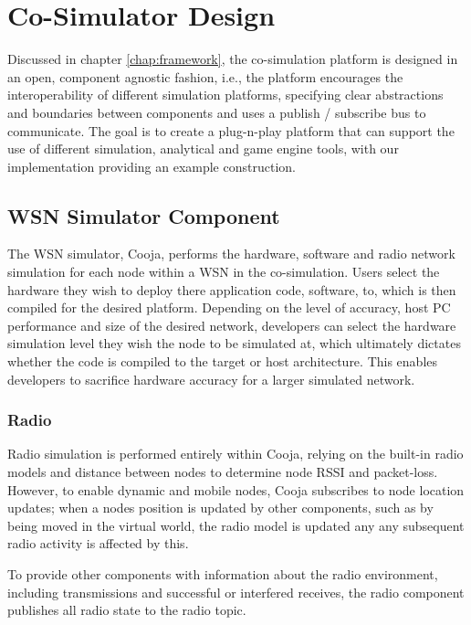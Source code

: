 \section{Co-Simulator Design}
\label{sec:Design}
Discussed in chapter \ref{chap:framework}, the co-simulation platform is designed in an open, component agnostic fashion, i.e., the platform encourages the interoperability of different simulation platforms, specifying clear abstractions and boundaries between components and uses a publish / subscribe bus to communicate. The goal is to create a plug-n-play platform that can support the use of different simulation, analytical and game engine tools, with our implementation providing an example construction.

\subsection{WSN Simulator Component} %
\label{sub:wsn_simulator_component}

The WSN simulator, Cooja, performs the hardware, software and radio network simulation for each node within a WSN in the co-simulation. 
Users select the hardware they wish to deploy there application code, software, to, which is then compiled for the desired platform. Depending on the level of accuracy, host PC performance and size of the desired network, developers can select the hardware simulation level they wish the node to be simulated at, which ultimately dictates whether the code is compiled to the target or host architecture. This enables developers to sacrifice hardware accuracy for a larger simulated network.

\subsubsection{Radio} %
\label{ssub:radio}

Radio simulation is performed entirely within Cooja, relying on the built-in radio models and distance between nodes to determine node RSSI and packet-loss. However, to enable dynamic and mobile nodes, Cooja subscribes to node location updates; when a nodes position is updated by other components, such as by being moved in the virtual world, the radio model is updated any any subsequent radio activity is affected by this.

To provide other components with information about the radio environment, including transmissions and successful or interfered receives, the radio component publishes all radio state to the radio topic. 

